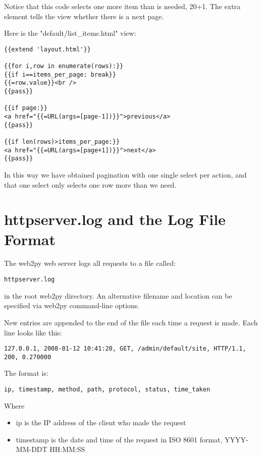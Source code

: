 \documentclass[justified,sixbynine,notoc]{tufte-book}
\def\inxx#1{\index{#1}}
\begin{document}
\begin{fullwidth}
Notice that this code selects one more item than is needed, 20+1. The extra element tells the view whether there is a next page.

Here is the "default/list\_items.html" view:
\begin{lstlisting}[keywords={}]
{{extend 'layout.html'}}

{{for i,row in enumerate(rows):}}
{{if i==items_per_page: break}}
{{=row.value}}<br />
{{pass}}

{{if page:}}
<a href="{{=URL(args=[page-1])}}">previous</a>
{{pass}}

{{if len(rows)>items_per_page:}}
<a href="{{=URL(args=[page+1])}}">next</a>
{{pass}}
\end{lstlisting}

In this way we have obtained pagination with one single select per action, and that one select only selects one row more than we need.

\goodbreak\section{httpserver.log and the Log File Format}

\inxx{httpserver.log}

The web2py web server logs all requests to a file called:
\begin{lstlisting}[keywords={}]
httpserver.log
\end{lstlisting}
\noindent in the root web2py directory. An alternative filename and location
can be specified via web2py command-line options.

New entries are appended to the end of the file each time a request is made. Each line looks like this:
\begin{lstlisting}
127.0.0.1, 2008-01-12 10:41:20, GET, /admin/default/site, HTTP/1.1, 200, 0.270000
\end{lstlisting}

The format is:
\begin{lstlisting}
ip, timestamp, method, path, protocol, status, time_taken
\end{lstlisting}

Where
\begin{itemize}
\item ip is the IP address of the client who made the request

\item timestamp is the date and time of the request in ISO 8601 format, YYYY-MM-DDT HH:MM:SS


\end{itemize}
\end{fullwidth}
\end{document}
